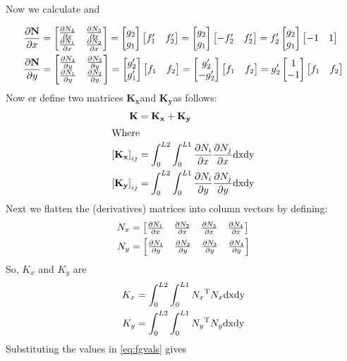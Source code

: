 Now we calculate  and 
\newcommand{\Nx}{\ensuremath{\dx{\mathbf{N}}}}
\newcommand{\Ny}{\ensuremath{\dy{\mathbf{N}}}}

\def\mv#1#2{
  \ensuremath{\begin{bmatrix}#1 \\ #2\end{bmatrix}}
}
\def\mh#1#2{
  \ensuremath{\begin{bmatrix}#1 & #2\end{bmatrix}}
}
\def\x{\mv{g_2}{g_1}}
\def\y{
  \ensuremath{\mh{f_1}{f_2}}
}
\begin{align}
  \Nx &=
        \begin{bmatrix}
          \Nij{4}{x} & \Nij{3}{x} \\
          \Nij{1}{x} & \Nij{2}{x} 
        \end{bmatrix}
                       = \x \mh{f_1'}{f_2'} = \x \mh{-f_2'}{f_2'}
                       = f_2' \x \mh{-1}{1}
                       \notag\\
  \Ny &=
        \begin{bmatrix}
          \Nij{4}{y} & \Nij{3}{y} \\
          \Nij{1}{y} & \Nij{2}{y} 
        \end{bmatrix}
                       = \mv{g_2'}{g_1'} \y = \mv{g_2'}{-g_2'} \y
                       = g_2'\mv{1}{-1} \y \notag
\end{align}
\def\Kx{\ensuremath{\mathbf{K_x}}}
\def\Ky{\ensuremath{\mathbf{K_y}}}
\newcommand{\Mij}[1]{
  \ensuremath{
    {\left[ #1 \right]}_{ij}
  }
}
Now er define two matrices \Kx and \Ky as follows:
\newcommand{\intc}[1]{
  \ensuremath{\int_0^{L2} \int_0^{L1} #1 \text{dxdy}}
}
\begin{align}
  \K &= \Kx + \Ky \notag\\
  \intertext{Where}
  \Mij{\Kx} &= \intc{\Nij{i}{x} \Nij{j}{x}} \notag\\
  \Mij{\Ky} &= \intc{\Nij{i}{y} \Nij{j}{y}} \notag
\end{align}
Next we flatten the (derivatives) \shpf{} matrices into column vectors by
defining:
\def\f#1{\ensuremath{N_{#1} &=
    \begin{bmatrix}
      \Nij{1}{#1} &
      \Nij{2}{#1} &
      \Nij{3}{#1} &
      \Nij{4}{#1} 
    \end{bmatrix}
  }
}
\begin{align}
  \f{x} \notag\\
  \f{y} \notag
\end{align}
So, $K_x$ and $K_y$ are
\begin{align}
  K_x &= \intc{\tr{N_x}N_x} \notag\\ 
  K_y &= \intc{\tr{N_y}N_y} \notag
\end{align}
Substituting the values in \cref{eq:fgvals} gives

